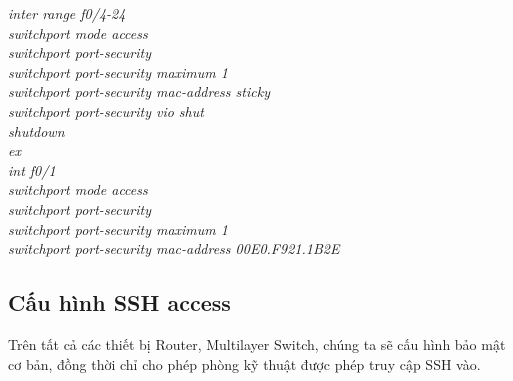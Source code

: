 \documentclass[a4paper, 12pt]{article}
\begin{document}
\hspace*{2cm}\textit{inter range f0/4-24\\
\hspace*{2cm}switchport mode access\\
\hspace*{2cm}switchport port-security\\
\hspace*{2cm}switchport port-security maximum 1\\
\hspace*{2cm}switchport port-security mac-address sticky\\
\hspace*{2cm}switchport port-security vio shut\\
\hspace*{2cm}shutdown\\
\hspace*{2cm}ex\\
\hspace*{2cm}int f0/1\\
\hspace*{2cm}switchport mode access\\
\hspace*{2cm}switchport port-security\\
\hspace*{2cm}switchport port-security maximum 1\\
\hspace*{2cm}switchport port-security mac-address 00E0.F921.1B2E\\}
\subsection{Cấu hình SSH access}
\hspace*{1cm}Trên tất cả các thiết bị Router, Multilayer Switch, chúng ta sẽ cấu hình bảo mật cơ bản, đồng thời chỉ cho phép phòng kỹ thuật được phép truy cập SSH vào.\\
\end{document}
